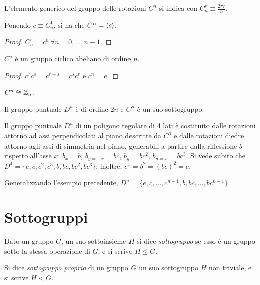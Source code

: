 \begin{definition}
	L'elemento generico del gruppo delle rotazioni $ C^n $ si indica con $ C_n^r \equiv \frac{2\pi r}{n} $.
\end{definition}

\begin{proposition}
	Ponendo $ c \equiv C_n^1 $, si ha che $ C^n = \braket{c} $.
\end{proposition}
\begin{proof}
	$ C_n^r = c^n \,\forall n = 0, \dots, n - 1 $.
\end{proof}

\begin{proposition}
	$ C^n $ è un gruppo ciclico abeliano di ordine $ n $.
\end{proposition}
\begin{proof}
	$ c^r c^s = c^{r + s} = c^s c^r $ e $ c^n = e $.
\end{proof}

\begin{proposition}
	$ C^n \cong \mathbb{Z}_n $.
\end{proposition}

\begin{proposition}
	Il gruppo puntuale $ D^n $ è di ordine $ 2n $ e $ C^n $ è un suo sottogruppo.
\end{proposition}

\begin{example}
	Il gruppo puntuale $ D^n $ di un poligono regolare di 4 lati è costituito dalle rotazioni attorno ad assi perpendicolati al piano descritte da $ C^4 $ e dalle rotazioni diedre attorno agli assi di simmetria nel piano, generabili a partire dalla riflessione $ b $ rispetto all'asse $ x $: $ b_x = b $, $ b_{y = -x} = bc $, $ b_y = bc^2 $, $ b_{y = x} = bc^3 $. Si vede subito che $ D^4 = \{e,c,c^2,c^3,b,bc,bc^2,bc^3\} $; inoltre, $ c^4 = b^2 = (bc)^2 = e $.
\end{example}
\begin{example}
	Generalizzando l'esempio precedente, $ D^n = \{e,c,\dots,c^{n-1},b,bc,\dots,bc^{n-1}\} $.
\end{example}

\section{Sottogruppi}

\begin{definition}
	Dato un gruppo $ G $, un suo sottoinsieme $ H $ si dice \textit{sottogruppo} se esso è un gruppo sotto la stessa operazione di $ G $, e si scrive $ H \le G $.
\end{definition}
\begin{definition}
	Si dice \textit{sottogruppo proprio} di un gruppo $ G $ un suo sottogruppo $ H $ non triviale, e si scrive $ H < G $.
\end{definition}

